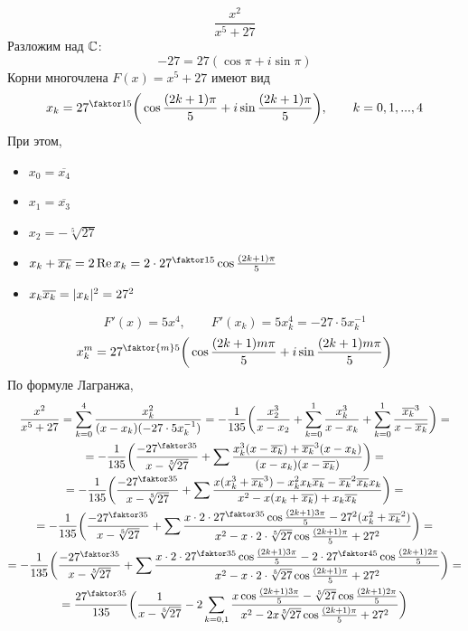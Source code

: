 $$ \frac{x^2}{x^5 + 27} $$
Разложим над $ \mathbb{C} $:
$$ -27 = 27(\cos \pi + i \sin \pi) $$
Корни многочлена $ F(x) = x^5 + 27 $ имеют вид
$$ x_k = 27^{\faktor15} \bigg( \cos \frac{(2k + 1)\pi}5 + i \sin \frac{(2k + 1)\pi}5 \bigg), \qquad k = 0, 1, ..., 4 $$
При этом,
\begin{itemize}
    \item $ x_0 = \overline{x_4} $
    \item $ x_1 = \overline{x_3} $
    \item $ x_2 = -\sqrt[5]{27} $
    \item $ x_k + \ol{x_k} = 2 \operatorname{Re} x_k = 2 \cdot 27^{\faktor15} \cos \frac{(2k + 1)\pi}5 $
    \item $ x_k\overline{x_k} = |x_k|^2 = 27^2 $
\end{itemize}
$$ F'(x) = 5x^4, \qquad F'(x_k) = 5x_k^4 = -27 \cdot 5 x_k^{-1} $$
$$ x_k^m = 27^{\faktor{m}5} \bigg( \cos \frac{(2k + 1)m\pi}5 + i \sin \frac{(2k + 1)m\pi}5 \bigg) $$
По формуле Лагранжа,
\begin{multline*}
    \frac{x^2}{x^5 + 27} = \sum_{k = 0}^4 \frac{x_k^2}{(x - x_k)(-27 \cdot 5 x_k^{-1})} = -\frac1{135} \bigg( \frac{x_2^3}{x - x_2} + \sum_{k = 0}^1 \frac{x_k^3}{x - x_k} + \sum_{k = 0}^1 \frac{\ol{x_k}^3}{x - \ol{x_k}} \bigg) = \\
    = -\frac1{135} \bigg( \frac{-27^{\faktor35}}{x - \sqrt[5]{27}} + \sum \frac{x_k^3(x - \ol{x_k}) + \ol{x_k}^3(x - x_k)}{(x - x_k)(x - \ol{x_k})} \bigg) = \\
    = -\frac1{135} \bigg( \frac{-27^{\faktor35}}{x - \sqrt[5]{27}} + \sum \frac{x(x_k^3 + \ol{x_k}^3) - x_k^2x_k\ol{x_k} - \ol{x_k}^2\ol{x_k}x_k}{x^2 - x(x_k + \ol{x_k}) + x_k\ol{x_k}} \bigg) = \\
    = -\frac1{135} \bigg( \frac{-27^{\faktor35}}{x - \sqrt[5]{27}} + \sum \frac{x \cdot 2 \cdot 27^{\faktor35} \cos \frac{(2k + 1)3\pi}5 - 27^2(x_k^2 + \ol{x_k}^2)}{x^2 - x \cdot 2 \cdot \sqrt[5]{27} \cos \frac{(2k + 1)\pi}5 + 27^2} \bigg) = \\
    = -\frac1{135} \bigg( \frac{-27^{\faktor35}}{x - \sqrt[5]{27}} + \sum \frac{x \cdot 2 \cdot 27^{\faktor35} \cos \frac{(2k + 1)3\pi}5 - 2 \cdot 27^{\faktor45} \cos \frac{(2k + 1)2\pi}5}{x^2 - x \cdot 2 \cdot \sqrt[5]{27} \cos \frac{(2k + 1)\pi}5 + 27^2} \bigg) = \\
    = \frac{27^{\faktor35}}{135} \bigg( \frac1{x - \sqrt[5]{27}} - 2\sum_{k = 0,1} \frac{x \cos \frac{(2k + 1)3\pi}5 - \sqrt[5]{27} \cos \frac{(2k + 1)2\pi}5}{x^2 - 2x\sqrt[5]{27} \cos \frac{(2k + 1)\pi}5 + 27^2} \bigg)
\end{multline*}

